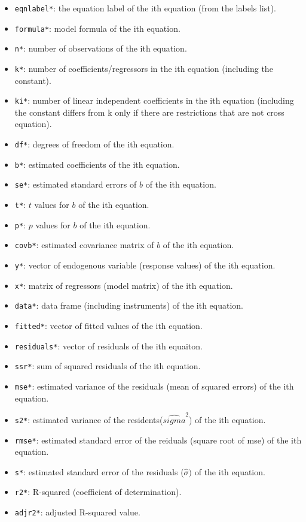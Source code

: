 \begin{itemize}
\item \texttt{eqnlabel*}: the equation label of the ith equation (from the labels list).
\item \texttt{formula*}: model formula of the ith equation.
\item \texttt{n*}: number of observations of the ith equation.
\item \texttt{k*}: number of coefficients/regressors in the ith equation (including the constant).
\item \texttt{ki*}: number of linear independent coefficients in the ith equation (including the
constant differs from k only if there are restrictions that are not cross equation).
\item \texttt{df*}: degrees of freedom of the ith equation.
\item \texttt{b*}: estimated coefficients of the ith equation. 
\item \texttt{se*}: estimated standard errors of $b$ of the ith equation.
\item \texttt{t*}: $t$ values for $b$ of the ith equation.
\item \texttt{p*}: $p$ values for $b$ of the ith equation.
\item \texttt{covb*}: estimated covariance matrix of $b$ of the ith equation.
\item \texttt{y*}: vector of endogenous variable (response values) of the ith equation.
\item \texttt{x*}: matrix of regressors (model matrix) of the ith equation.
\item \texttt{data*}: data frame (including instruments) of the ith equation.
\item \texttt{fitted*}: vector of fitted values of the ith equation.
\item \texttt{residuals*}: vector of residuals of the ith equaiton.
\item \texttt{ssr*}: sum of squared residuals of the ith equation.
\item \texttt{mse*}: estimated variance of the residuals (mean of squared errors) of the ith equation.
\item \texttt{s2*}: estimated variance of the residents($\hat{sigma}^2$) of the ith equation.
\item \texttt{rmse*}: estimated standard error of the reiduals (square root of mse) of the ith equation.
\item \texttt{s*}: estimated standard error of the residuals ($\hat{\sigma})$ of the ith equation.
\item \texttt{r2*}: R-squared (coefficient of determination).
\item \texttt{adjr2*}: adjusted R-squared value.



\end{itemize}
